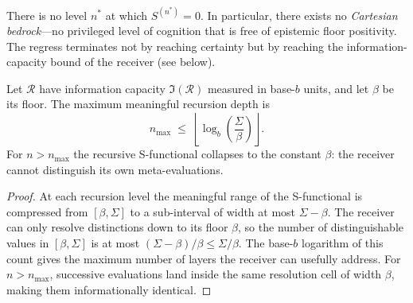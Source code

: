 \begin{corollary}
\label{cor:ch02-regress}
There is no level $n^*$ at which $S^{(n^*)} = 0$.  In particular, there exists
no \emph{Cartesian bedrock}---no privileged level of cognition that is free of
epistemic floor positivity.  The regress terminates not by reaching certainty
but by reaching the information-capacity bound of the receiver (see
 below).
\end{corollary}

\begin{theorem}
\label{thm:ch02-depth-bound}
Let $\mathcal{R}$ have information capacity $\mathfrak{I}(\mathcal{R})$ measured
in base-$b$ units, and let $\beta$ be its floor.  The maximum meaningful
recursion depth is
\[
  n_{\max}
  \;\leq\;
  \left\lfloor \log_b\!\left(\frac{\Sigma}{\beta}\right) \right\rfloor.
\]
For $n > n_{\max}$ the recursive S-functional collapses to the constant
$\beta$: the receiver cannot distinguish its own meta-evaluations.
\end{theorem}

\begin{proof}
At each recursion level the meaningful range of the S-functional is compressed
from $[\beta, \Sigma]$ to a sub-interval of width at most $\Sigma - \beta$.
The receiver can only resolve distinctions down to its floor $\beta$, so the
number of distinguishable values in $[\beta, \Sigma]$ is at most
$(\Sigma - \beta)/\beta \leq \Sigma/\beta$.  The base-$b$ logarithm of this
count gives the maximum number of layers the receiver can usefully address.
For $n > n_{\max}$, successive evaluations land inside the same resolution
cell of width $\beta$, making them informationally identical.
\end{proof}

